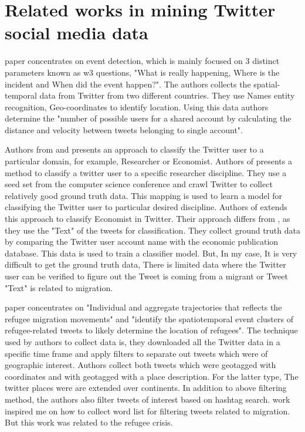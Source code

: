 \section{Related works in mining Twitter social media data}




\cite{Goergen} paper concentrates on event detection, which is mainly focused on 3 distinct parameters
known as w3 questions, "What is really happening, Where is the incident and When did the
event happen?". The authors collects the spatial-temporal data from Twitter from two different
countries. They use Names entity recognition, Geo-coordinates to identify location. Using this
data authors determine the "number of possible users for a shared account by calculating the
distance and velocity between tweets belonging to single account".

 
Authors from \cite{Hadgu} and  \cite{Böhm2017} presents an approach to classify the Twitter user to a particular domain, for example, Researcher or Economist. Authors of \cite{Hadgu} presents a method to classify a twitter user to a specific researcher discipline. They use a seed set from the computer science conference and crawl Twitter to collect relatively good ground truth data. This mapping is used to learn a model for classifying the Twitter user to particular desired discipline. Authors of \cite{Böhm2017}  extends this approach to classify Economist in Twitter. Their approach differs from \cite{Hadgu}, as they use the "Text" of the tweets for classification. They collect ground truth data by comparing the Twitter user account name with the economic publication database. This data is used to train a classifier model. But, In my case, It is very difficult to get the ground truth data, There is limited data where the Twitter user can be verified to figure out the Tweet is coming from a migrant or Tweet "Text" is related to migration. 
 
\cite{Hübl} paper concentrates on "Individual and aggregate trajectories that reflects the refugee migration
movements" and "identify the spatiotemporal event clusters of refugee-related tweets to
likely determine the location of refugees". The technique used by authors to collect data is, they
downloaded all the Twitter data in a specific time frame and apply filters to separate out tweets
which were of geographic interest. Authors collect both tweets which were geotagged with coordinates
and with geotagged with a place description. For the latter type, The twitter places were
are extended over continents. In addition to above filtering method, the authors also filter tweets
of interest based on hashtag search. \cite{Hübl} work inspired me on how to collect word list for filtering
tweets related to migration. But this work was related to the refugee crisis.
 
